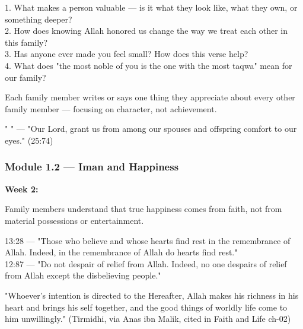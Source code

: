 \documentclass[11pt,a4paper]{article}
\begin{document}
\begin{discussionbox} 1. What makes a person valuable --- is it what they look like, what they own, or something deeper? \\ 2. How does knowing Allah honored us change the way we treat each other in this family? \\ 3. Has anyone ever made you feel small? How does this verse help? \\ 4. What does "the most noble of you is the one with the most taqwa" mean for our family? \end{discussionbox}

\begin{activitybox} Each family member writes or says one thing they appreciate about every other family member --- focusing on character, not achievement. \end{activitybox}

\begin{duabox} "       " --- "Our Lord, grant us from among our spouses and offspring comfort to our eyes." (25:74) \end{duabox}

\vspace{6pt}\noindent{\color{border}\rule{\textwidth}{0.5pt}}\vspace{6pt}

\subsubsection*{Module 1.2 --- Iman and Happiness}
\textbf{Week 2:} 

\begin{outcomebox} Family members understand that true happiness comes from faith, not from material possessions or entertainment. \end{outcomebox}

\begin{quranbox} 13:28 --- "Those who believe and whose hearts find rest in the remembrance of Allah. Indeed, in the remembrance of Allah do hearts find rest." \\ 12:87 --- "Do not despair of relief from Allah. Indeed, no one despairs of relief from Allah except the disbelieving people." \end{quranbox}

\begin{hadithbox} "Whoever's intention is directed to the Hereafter, Allah makes his richness in his heart and brings his self together, and the good things of worldly life come to him unwillingly." (Tirmidhi, via Anas ibn Malik, cited in Faith and Life ch-02) \end{hadithbox}
\end{document}
